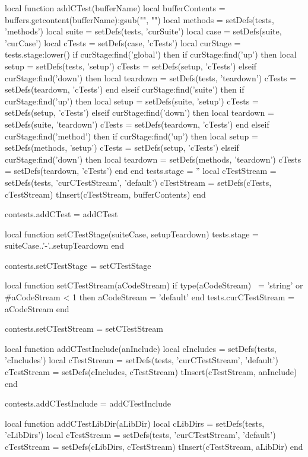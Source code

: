 \startLuaCode
local function addCTest(bufferName)
  local bufferContents = buffers.getcontent(bufferName):gsub("", "\n")
  local methods        = setDefs(tests, 'methods')
  local suite          = setDefs(tests, 'curSuite')
  local case           = setDefs(suite, 'curCase')
  local cTests         = setDefs(case, 'cTests')
  local curStage       = tests.stage:lower()
  if curStage:find('global') then
    if curStage:find('up') then
      local setup      = setDefs(tests, 'setup')
      cTests           = setDefs(setup, 'cTests')
    elseif curStage:find('down') then
      local teardown   = setDefs(tests, 'teardown')
      cTests           = setDefs(teardown, 'cTests')
    end
  elseif curStage:find('suite') then
    if curStage:find('up') then
      local setup      = setDefs(suite, 'setup')
      cTests           = setDefs(setup, 'cTests')
    elseif curStage:find('down') then
      local teardown   = setDefs(suite, 'teardown')
      cTests           = setDefs(teardown, 'cTests')
    end
  elseif curStage:find('method') then
    if curStage:find('up') then
      local setup      = setDefs(methods, 'setup')
      cTests           = setDefs(setup, 'cTests')
    elseif curStage:find('down') then
      local teardown   = setDefs(methods, 'teardown')
      cTests           = setDefs(teardown, 'cTests')
    end
  end
  tests.stage          = ''
  local cTestStream    = setDefs(tests, 'curCTestStream', 'default')
  cTestStream          = setDefs(cTests, cTestStream)
  tInsert(cTestStream, bufferContents)
end

contests.addCTest = addCTest

local function setCTestStage(suiteCase, setupTeardown)
  tests.stage = suiteCase..'-'..setupTeardown
end

contests.setCTestStage = setCTestStage

local function setCTestStream(aCodeStream)
  if type(aCodeStream) ~= 'string'
    or #aCodeStream < 1 then
    aCodeStream = 'default'
  end
  tests.curCTestStream = aCodeStream
end

contests.setCTestStream = setCTestStream

local function addCTestInclude(anInclude)
  local cIncludes        = setDefs(tests, 'cIncludes')
  local cTestStream      = setDefs(tests, 'curCTestStream', 'default')
  cTestStream            = setDefs(cIncludes, cTestStream)
  tInsert(cTestStream, anInclude)
end

contests.addCTestInclude = addCTestInclude

local function addCTestLibDir(aLibDir)
  local cLibDirs        = setDefs(tests, 'cLibDirs')
  local cTestStream     = setDefs(tests, 'curCTestStream', 'default')
  cTestStream           = setDefs(cLibDirs, cTestStream)
  tInsert(cTestStream, aLibDir)
end

